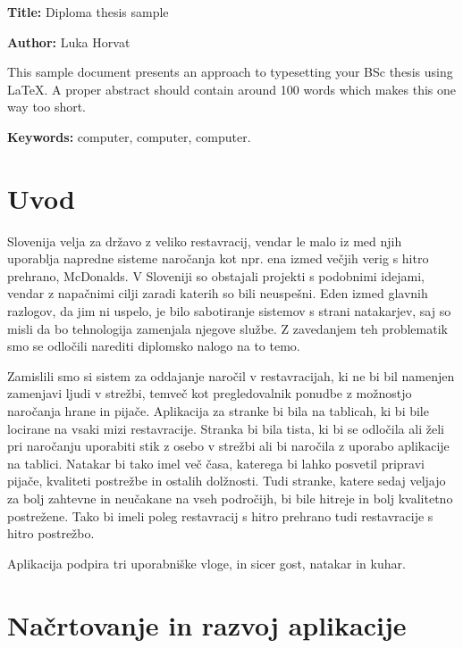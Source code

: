 \documentclass[a4paper, 12pt]{book}
\newcommand{\ttitleEn}{Diploma thesis sample}
\newcommand{\tauthor}{Luka Horvat}
\newcommand{\tkeywordsEn}{computer, computer, computer}
\newcommand{\clearemptydoublepage}{\newpage{\pagestyle{empty}\cleardoublepage}}
\begin{document}
\noindent\textbf{Title:} \ttitleEn
\bigskip

\noindent\textbf{Author:} \tauthor
\bigskip

\noindent This sample document presents an approach to typesetting your BSc thesis using \LaTeX. 
A proper abstract should contain around 100 words which makes this one way too short.
\bigskip

\noindent\textbf{Keywords:} \tkeywordsEn.
\clearemptydoublepage

\mainmatter
\setcounter{page}{1}
\pagestyle{fancy}

\chapter{Uvod}
Slovenija velja za državo z veliko restavracij, vendar le malo iz med njih uporablja napredne sisteme naročanja kot npr. ena izmed večjih verig s hitro prehrano, McDonalds. V Sloveniji so obstajali projekti s podobnimi idejami, vendar z napačnimi cilji zaradi katerih so bili neuspešni. Eden izmed glavnih razlogov, da jim ni uspelo, je bilo sabotiranje sistemov s strani natakarjev, saj so misli da bo tehnologija zamenjala njegove službe. Z zavedanjem teh problematik smo se odločili narediti diplomsko nalogo na to temo. 

Zamislili smo si sistem za oddajanje naročil v restavracijah, ki ne bi bil namenjen zamenjavi ljudi v strežbi, temveč kot pregledovalnik ponudbe z možnostjo naročanja hrane in pijače. Aplikacija za stranke bi bila na tablicah, ki bi bile locirane na vsaki mizi restavracije. Stranka bi bila tista, ki bi se odločila ali želi pri naročanju uporabiti stik z osebo v strežbi ali bi naročila z uporabo aplikacije na tablici. Natakar bi tako imel več časa, katerega bi lahko posvetil pripravi pijače, kvaliteti postrežbe in ostalih dolžnosti. Tudi stranke, katere sedaj veljajo za bolj zahtevne in neučakane na vseh področijh, bi bile hitreje in bolj kvalitetno postrežene. Tako bi imeli poleg restavracij s hitro prehrano tudi restavracije s hitro postrežbo. 


Aplikacija podpira tri uporabniške vloge, in sicer gost, natakar in kuhar. 

\chapter{Načrtovanje in razvoj aplikacije}
\end{document}
